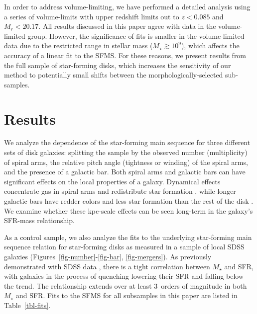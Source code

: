 \documentclass[useAMS,usenatbib]{mn2e}
\def\rr{\color{titlecol}}
\begin{document}
In order to address volume-limiting, we have performed a detailed analysis using a series of volume-limits with upper redshift limits out to $z<0.085$ and $M_r < 20.17$. All results discussed in this paper agree with data in the volume-limited group. However, the significance of fits is smaller in the volume-limited data due to the restricted range in stellar mass ($M_\star\gtrsim10^9$), which affects the accuracy of a linear fit to the SFMS. For these reasons, we present results from the full sample of star-forming disks, which increases the sensitivity of our method to potentially small shifts between the morphologically-selected sub-samples. 


\section{Results} \label{sec-results}

We analyze the dependence of the star-forming main sequence for three different sets of disk galaxies: splitting the sample by the observed number (multiplicity) of spiral arms, the relative pitch angle (tightness or winding) of the spiral arms, and the presence of a galactic bar. Both spiral arms and galactic bars can have significant effects on the local properties of a galaxy. Dynamical effects concentrate gas in spiral arms and redistribute star formation \citep{elm86,foy10}, while longer galactic bars have redder colors and less star formation than the rest of the disk \citep{hoy11,mas12a}. We examine whether these kpc-scale effects can be seen long-term in the galaxy's SFR-mass relationship. 

As a control sample, we also analyze the fits to the underlying star-forming main sequence relation for star-forming disks as measured in a sample of local SDSS galaxies (Figures~\ref{fig-number}-\ref{fig-bar}, \ref{fig-mergers}). As previously demonstrated with SDSS data \citep[e.g.,][]{bri04}, there is a tight correlation between $M_\star$ and SFR, with galaxies in the process of quenching lowering their SFR and falling below the trend. The relationship extends over at least {\rr 3~orders of magnitude} in both $M_\star$ and SFR. Fits to the SFMS for all subsamples in this paper are listed in Table~\ref{tbl-fits}.
\end{document}
